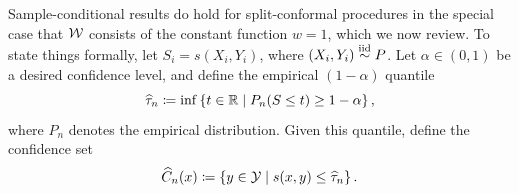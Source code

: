\documentclass{article}
\newcommand{\scorefunc}{s}
\newcommand{\scoreval}{\scorefunc}
\newcommand{\scorerv}{S}
\begin{document}


Sample-conditional results do hold for split-conformal procedures
in the special case that $\mathcal{W}$ consists of the constant function
$w = 1$, which we now review.
%
To state things formally, let $\scorerv_i = \scoreval(X_i, Y_i)$,
where $(X_i, Y_i) \stackrel{\rm iid}{\sim} P$.
%
Let $\alpha \in (0, 1)$ be a desired confidence level, and define the
empirical $(1 - \alpha)$ quantile
\begin{equation*}
  \what{\tau}_n \defeq \inf\left\{t \in \R \mid
  P_n(\scorerv \le t) \ge 1 - \alpha \right\},
\end{equation*}
where $P_n$ denotes the empirical distribution.
%
Given this quantile, define the confidence set
\begin{equation*}
  \what{C}_n(x) \defeq \left\{y \in \mc{Y} \mid \scorefunc(x, y)
  \le \what{\tau}_n \right\}.
\end{equation*}
\end{document}
